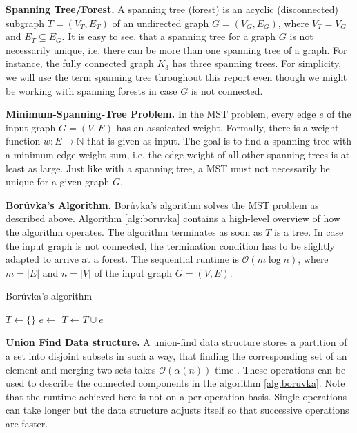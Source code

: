 \documentclass[letterpaper]{article}
\newcommand{\N}[0]{\mathbb{N}}
\newcommand{\bigoh}{\mathcal O}
\newcommand{\mypar}[1]{{\bf #1.}}
\begin{document}
\mypar{Spanning Tree/Forest}
A spanning tree (forest) is an acyclic (disconnected) subgraph $T = (V_T, E_T)$ of an undirected graph $G = (V_G, E_G)$,
where $V_T = V_G$ and $E_T \subseteq E_G$. It is easy to see, that a spanning tree for a graph $G$ is not necessarily
unique, i.e. there can be more than one spanning tree of a graph. For instance, the fully connected graph $K_3$ has
three spanning trees. For simplicity, we will use the term spanning tree throughout this report even though we might be
working with spanning forests in case $G$ is not connected.

\mypar{Minimum-Spanning-Tree Problem}
In the MST problem, every edge $e$ of the input graph $G = (V, E)$ has an assoicated weight. Formally, there is a weight
function $w : E \to \N$ that is given as input. The goal is to find a spanning tree with a minimum edge weight sum, i.e.
the edge weight of all other spanning trees is at least as large. Just like with a spanning tree, a MST must not
necessarily be unique for a given graph $G$.

\mypar{Bor\r{u}vka's Algorithm}
Bor\r{u}vka's algorithm \cite{boruuvka1926jistem, nevsetvril2001otakar} solves the MST problem as described above.
Algorithm \ref{alg:boruvka} contains a high-level overview of how the algorithm operates. The algorithm terminates as
soon as $T$ is a tree. In case the input graph is not connected, the termination condition has to be slightly adapted to
arrive at a forest. The sequential runtime is $\bigoh(m \log n)$, where $m = |E|$ and $n = |V|$ of the input graph $G =
(V, E)$.

\begin{algorithm}
\caption{Bor\r{u}vka's algorithm} \label{alg:boruvka}
\begin{algorithmic}
\State $T \gets \{ \}$
\State $e \gets$ 
\State $T \gets T \cup e$
\EndFor
\EndWhile
\end{algorithmic}
\end{algorithm}

\mypar{Union Find Data structure}
A union-find data structure stores a partition of a set into disjoint subsets in such a way, that finding the
corresponding set of an element and merging two sets takes $\bigoh(\alpha(n))$ time \cite{efficiency_union_find}. These
operations can be used to describe the connected components in the algorithm \ref{alg:boruvka}. Note that the runtime
achieved here is not on a per-operation basis. Single operations can take longer but the data structure adjusts itself
so that successive operations are faster.
\end{document}
